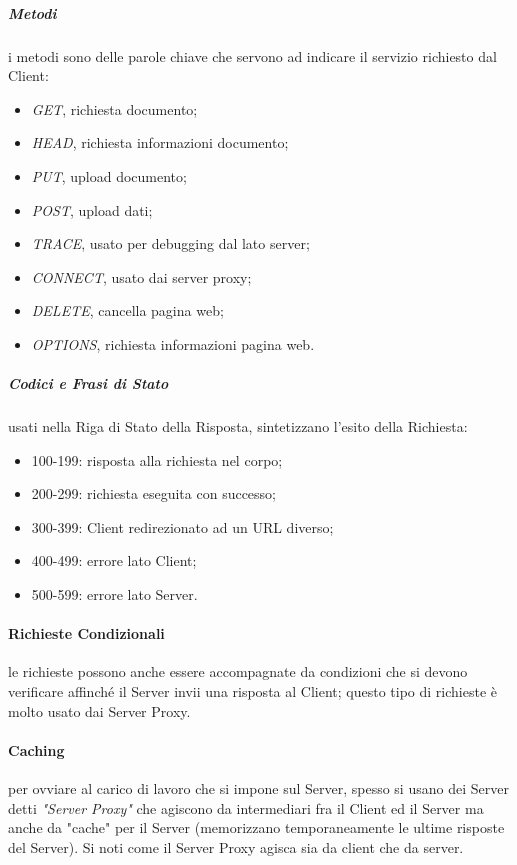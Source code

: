 \documentclass[a4paper]{article}
\begin{document}
				\newpage			
				
				\subparagraph{\emph{Metodi}}
					i metodi sono delle parole chiave che servono ad indicare il servizio richiesto dal Client:
					\begin{itemize}
						\item \emph{GET}, richiesta documento;
						\item \emph{HEAD}, richiesta informazioni documento;
						\item \emph{PUT}, upload documento;
						\item \emph{POST}, upload dati;
						\item \emph{TRACE}, usato per debugging dal lato server;
						\item \emph{CONNECT}, usato dai server proxy;
						\item \emph{DELETE}, cancella pagina web;
						\item \emph{OPTIONS}, richiesta informazioni pagina web.
					\end{itemize}
					
				\subparagraph{\emph{Codici e Frasi di Stato}}
					usati nella Riga di Stato della Risposta, sintetizzano l'esito della Richiesta:
					\begin{itemize}
						\item 100-199: risposta alla richiesta nel corpo;
						\item 200-299: richiesta eseguita con successo;
						\item 300-399: Client redirezionato ad un URL diverso;
						\item 400-499: errore lato Client;
						\item 500-599: errore lato Server.	
					\end{itemize}
					
					
				\paragraph{Richieste Condizionali}
					le richieste possono anche essere accompagnate da condizioni che si devono verificare affinché il Server invii una risposta al Client; questo tipo di richieste è molto usato dai Server Proxy.
					
					
				\paragraph{Caching}
					per ovviare al carico di lavoro che si impone sul Server, spesso si usano dei Server detti \emph{"Server Proxy"} che agiscono da intermediari fra il Client ed il Server ma anche da "cache" per il Server (memorizzano temporaneamente le ultime risposte del Server). Si noti come il Server Proxy agisca sia da client che da server.
					
\end{document}

